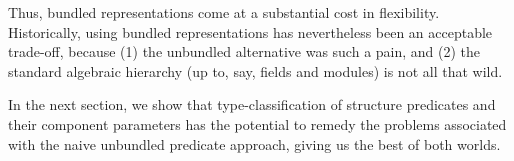 \documentclass[a4paper,10pt,runningheads]{llncs}
\begin{document}
Thus, bundled representations come at a substantial cost in flexibility. Historically, using bundled representations has nevertheless been an acceptable trade-off, because (1) the unbundled alternative was such a pain, and (2) the standard algebraic hierarchy (up to, say, fields and modules) is not all that wild.

In the next section, we show that type-classification of structure predicates and their component parameters has the potential to remedy the problems associated with the naive unbundled predicate approach, giving us the best of both worlds.





\end{document}

